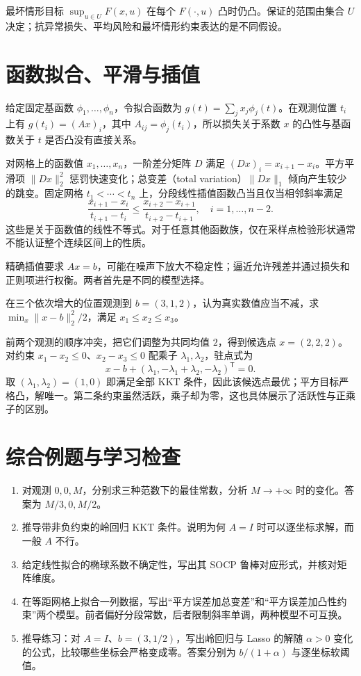 最坏情形目标 $\sup_{u\in U}F(x,u)$ 在每个 $F(\cdot,u)$ 凸时仍凸。保证的范围由集合 $U$ 决定；抗异常损失、平均风险和最坏情形约束表达的是不同假设。

\section{函数拟合、平滑与插值}

给定固定基函数 $\phi_1,\ldots,\phi_n$，令拟合函数为 $g(t)=\sum_jx_j\phi_j(t)$。在观测位置 $t_i$ 上有 $g(t_i)=(Ax)_i$，其中 $A_{ij}=\phi_j(t_i)$，所以损失关于系数 $x$ 的凸性与基函数关于 $t$ 是否凸没有直接关系。

对网格上的函数值 $x_1,\ldots,x_n$，一阶差分矩阵 $D$ 满足 $(Dx)_i=x_{i+1}-x_i$。平方平滑项 $\|Dx\|_2^2$ 惩罚快速变化；总变差（total variation）$\|Dx\|_1$ 倾向产生较少的跳变。固定网格 $t_1<\cdots<t_n$ 上，分段线性插值函数凸当且仅当相邻斜率满足
\[
 \frac{x_{i+1}-x_i}{t_{i+1}-t_i}
 \leq\frac{x_{i+2}-x_{i+1}}{t_{i+2}-t_{i+1}},\quad i=1,\ldots,n-2.
\]
这些是关于函数值的线性不等式。对于任意其他函数族，仅在采样点检验形状通常不能认证整个连续区间上的性质。

精确插值要求 $Ax=b$，可能在噪声下放大不稳定性；逼近允许残差并通过损失和正则项进行权衡。两者首先是不同的模型选择。

\begin{example}[由单调性约束修正一组观测]
在三个依次增大的位置观测到 $b=(3,1,2)$，认为真实数值应当不减，求 $\min_x\|x-b\|_2^2/2$，满足 $x_1\leq x_2\leq x_3$。
\end{example}
\begin{solve}
前两个观测的顺序冲突，把它们调整为共同均值 $2$，得到候选点 $x=(2,2,2)$。对约束 $x_1-x_2\leq0$、$x_2-x_3\leq0$ 配乘子 $\lambda_1,\lambda_2$，驻点式为
\[
 x-b+(\lambda_1,-\lambda_1+\lambda_2,-\lambda_2)^{\mathsf T}=0.
\]
取 $(\lambda_1,\lambda_2)=(1,0)$ 即满足全部 KKT 条件，因此该候选点最优；平方目标严格凸，解唯一。第二条约束虽然活跃，乘子却为零，这也具体展示了活跃性与正乘子的区别。
\end{solve}

\section{综合例题与学习检查}
\begin{enumerate}
 \item 对观测 $0,0,M$，分别求三种范数下的最佳常数，分析 $M\to+\infty$ 时的变化。答案为 $M/3,0,M/2$。
 \item 推导带非负约束的岭回归 KKT 条件。说明为何 $A=I$ 时可以逐坐标求解，而一般 $A$ 不行。
 \item 给定线性拟合的椭球系数不确定性，写出其 SOCP 鲁棒对应形式，并核对矩阵维度。
 \item 在等距网格上拟合一列数据，写出“平方误差加总变差”和“平方误差加凸性约束”两个模型。前者偏好分段常数，后者限制斜率单调，两种模型不可互换。
 \item 推导练习：对 $A=I$、$b=(3,1/2)$，写出岭回归与 Lasso 的解随 $\alpha>0$ 变化的公式，比较哪些坐标会严格变成零。答案分别为 $b/(1+\alpha)$ 与逐坐标软阈值。
\end{enumerate}


